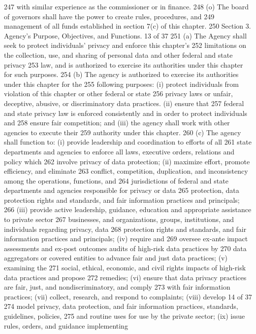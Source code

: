 247 with similar experience as the commissioner or in finance.
248 (o) The board of governors shall have the power to create rules, procedures, and
249 management of all funds established in section 7(c) of this chapter.
250 Section 3. Agency’s Purpose, Objectives, and Functions.
13 of 37
251 (a) The Agency shall seek to protect individuals’ privacy and enforce this chapter’s
252 limitations on the collection, use, and sharing of personal data and other federal and state privacy
253 law, and is authorized to exercise its authorities under this chapter for such purposes.
254 (b) The agency is authorized to exercise its authorities under this chapter for the
255 following purposes: (i) protect individuals from violation of this chapter or other federal or state
256 privacy laws or unfair, deceptive, abusive, or discriminatory data practices. (ii) ensure that
257 federal and state privacy law is enforced consistently and in order to protect individuals and
258 ensure fair competition; and (iii) the agency shall work with other agencies to execute their
259 authority under this chapter.
260 (c) The agency shall function to: (i) provide leadership and coordination to efforts of all
261 state departments and agencies to enforce all laws, executive orders, relations and policy which
262 involve privacy of data protection; (ii) maximize effort, promote efficiency, and eliminate
263 conflict, competition, duplication, and inconsistency among the operations, functions, and
264 jurisdictions of federal and state departments and agencies responsible for privacy or data
265 protection, data protection rights and standards, and fair information practices and principals;
266 (iii) provide active leadership, guidance, education and appropriate assistance to private sector
267 businesses, and organizations, groups, institutions, and individuals regarding privacy, data
268 protection rights and standards, and fair information practices and principals; (iv) require and
269 oversee ex-ante impact assessments and ex-post outcomes audits of high-risk data practices by
270 data aggregators or covered entities to advance fair and just data practices; (v) examining the
271 social, ethical, economic, and civil rights impacts of high-risk data practices and propose
272 remedies; (vi) ensure that data privacy practices are fair, just, and nondiscriminatory, and comply
273 with fair information practices; (vii) collect, research, and respond to complaints; (viii) develop
14 of 37
274 model privacy, data protection, and fair information practices, standards, guidelines, policies,
275 and routine uses for use by the private sector; (ix) issue rules, orders, and guidance implementing
